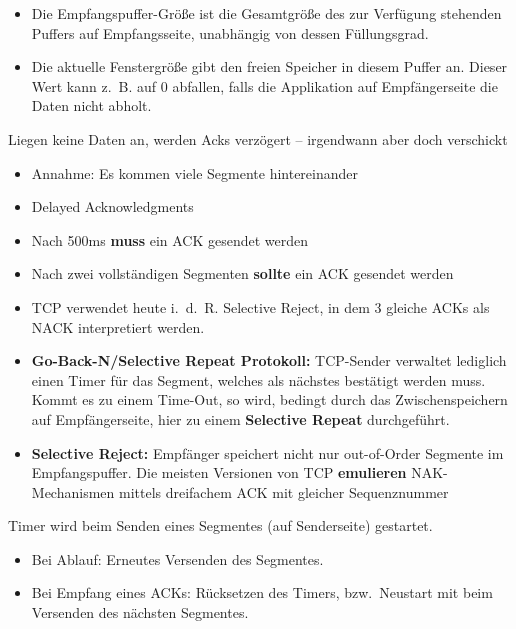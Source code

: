 \begin{itemize}
    \item Die Empfangspuffer-Größe ist die Gesamtgröße des zur Verfügung stehenden Puffers auf Empfangsseite, unabhängig von dessen Füllungsgrad.
    \item Die aktuelle Fenstergröße gibt den freien Speicher in diesem Puffer an.
    Dieser Wert kann z.\ B. auf 0 abfallen, falls die Applikation auf Empfängerseite die Daten nicht abholt.
\end{itemize}

Liegen keine Daten an, werden
Acks verzögert – irgendwann aber
doch verschickt
\begin{itemize}
    \item Annahme: Es kommen viele Segmente hintereinander
    \item Delayed Acknowledgments
    \item Nach 500ms \textbf{muss} ein ACK gesendet werden
    \item Nach zwei vollständigen Segmenten \textbf{sollte} ein ACK gesendet werden
\end{itemize}

\begin{itemize}
    \item TCP verwendet heute i.\ d.\ R. Selective Reject, in dem 3 gleiche ACKs als NACK interpretiert werden.
    \item \textbf{Go-Back-N/Selective Repeat Protokoll:} TCP-Sender verwaltet lediglich einen Timer für das Segment, welches als nächstes bestätigt werden muss.
    Kommt es zu einem Time-Out, so wird, bedingt durch das Zwischenspeichern auf Empfängerseite, hier zu einem \textbf{Selective Repeat} durchgeführt.
    \item \textbf{Selective Reject:} Empfänger speichert nicht nur out-of-Order Segmente im Empfangspuffer.
    Die meisten Versionen von TCP \textbf{emulieren} NAK-Mechanismen mittels dreifachem ACK mit gleicher Sequenznummer
\end{itemize}

Timer wird beim Senden eines Segmentes (auf Senderseite) gestartet.
\begin{itemize}
    \item Bei Ablauf: Erneutes Versenden des Segmentes.
    \item Bei Empfang eines ACKs: Rücksetzen des Timers, bzw.\ Neustart mit beim Versenden des nächsten Segmentes.
\end{itemize}

